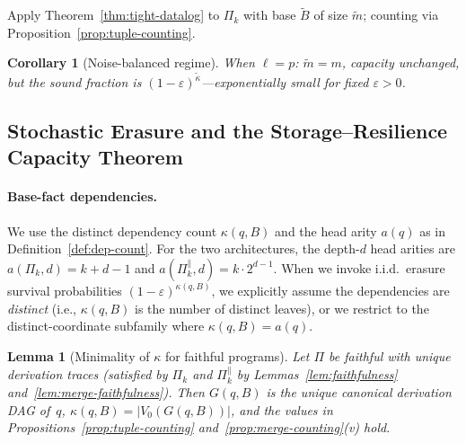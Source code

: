 \documentclass[journal]{IEEEtran}
\makeatletter
\newtheorem{lemma}{Lemma}[section]
\newtheorem{corollary}{Corollary}[section]
\numberwithin{equation}{section}
\renewenvironment{proof}[1][\proofname]{\par
  \pushQED{\qed}%
  \normalfont \topsep6\p@\@plus6\p@\relax
  \trivlist
  \item[\hskip\labelsep
        \itshape
    #1\@addpunct{.}]\ignorespaces
}{%
  \popQED\endtrivlist\@endpefalse
}
\makeatother
\begin{document}
\begin{proof}
Apply Theorem~\ref{thm:tight-datalog} to $\Pi_k$ with base
$\tilde B$ of size $\tilde m$; counting via
Proposition~\ref{prop:tuple-counting}.
\end{proof}

\begin{corollary}[Noise-balanced regime]
\label{cor:noise-balanced}
When $\ell=p$: $\tilde m=m$, capacity unchanged, but the sound
fraction is $(1{-}\varepsilon)^{\tilde\kappa}$---exponentially
small for fixed $\varepsilon>0$.
\end{corollary}

\subsection{Stochastic Erasure and the Storage--Resilience
  Capacity Theorem}
\label{subsec:stochastic-erasure}

\paragraph{Base-fact dependencies.}
We use the distinct dependency count \(\kappa(q,B)\) and the head arity \(a(q)\)
as in Definition~\ref{def:dep-count}.
For the two architectures, the depth-\(d\) head arities are
\(a(\Pi_k,d)=k+d-1\) and \(a(\Pi_k^{\parallel},d)=k\cdot 2^{d-1}\).
When we invoke i.i.d.\ erasure survival probabilities \((1-\varepsilon)^{\kappa(q,B)}\),
we explicitly assume the dependencies are \emph{distinct} (i.e., \(\kappa(q,B)\)
is the number of distinct leaves), or we restrict to the distinct-coordinate
subfamily where \(\kappa(q,B)=a(q)\).

\begin{lemma}[Minimality of $\kappa$ for faithful programs]
\label{lem:kappa-minimal}
Let $\Pi$ be faithful with unique derivation traces
\textup{(}satisfied by $\Pi_k$ and $\Pi_k^{\parallel}$
by Lemmas~\textup{\ref{lem:faithfulness}}
and~\textup{\ref{lem:merge-faithfulness})}.
Then $G(q,B)$ is the unique canonical derivation DAG of~$q$,
$\kappa(q,B)=|V_0(G(q,B))|$, and the values in
Propositions~\textup{\ref{prop:tuple-counting}}
and~\textup{\ref{prop:merge-counting}(v)} hold.
\end{lemma}
\end{document}
